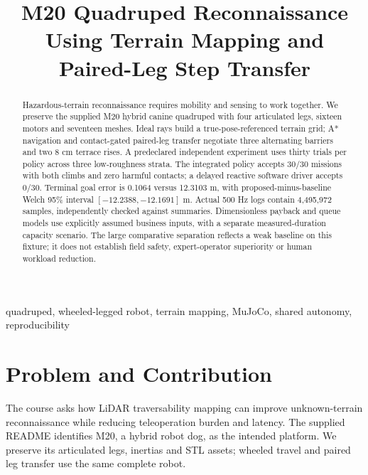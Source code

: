 \documentclass[conference]{IEEEtran}
\begin{document}
\title{M20 Quadruped Reconnaissance Using Terrain Mapping and Paired-Leg Step Transfer}
\author{
}
\maketitle
\begin{abstract}
Hazardous-terrain reconnaissance requires mobility and sensing to work together. We preserve the supplied M20 hybrid canine quadruped with four articulated legs, sixteen motors and seventeen meshes. Ideal rays build a true-pose-referenced terrain grid; A* navigation and contact-gated paired-leg transfer negotiate three alternating barriers and two 8 cm terrace rises. A predeclared independent experiment uses thirty trials per policy across three low-roughness strata. The integrated policy accepts 30/30 missions with both climbs and zero harmful contacts; a delayed reactive software driver accepts 0/30. Terminal goal error is 0.1064 versus 12.3103 m, with proposed-minus-baseline Welch 95\% interval $[-12.2388,-12.1691]$ m. Actual 500 Hz logs contain 4,495,972 samples, independently checked against summaries. Dimensionless payback and queue models use explicitly assumed business inputs, with a separate measured-duration capacity scenario. The large comparative separation reflects a weak baseline on this fixture; it does not establish field safety, expert-operator superiority or human workload reduction.
\end{abstract}
\begin{IEEEkeywords}
quadruped, wheeled-legged robot, terrain mapping, MuJoCo, shared autonomy, reproducibility
\end{IEEEkeywords}

\section{Problem and Contribution}
The course asks how LiDAR traversability mapping can improve unknown-terrain reconnaissance while reducing teleoperation burden and latency. The supplied README identifies M20, a hybrid robot dog, as the intended platform. We preserve its articulated legs, inertias and STL assets; wheeled travel and paired leg transfer use the same complete robot.
\end{document}
